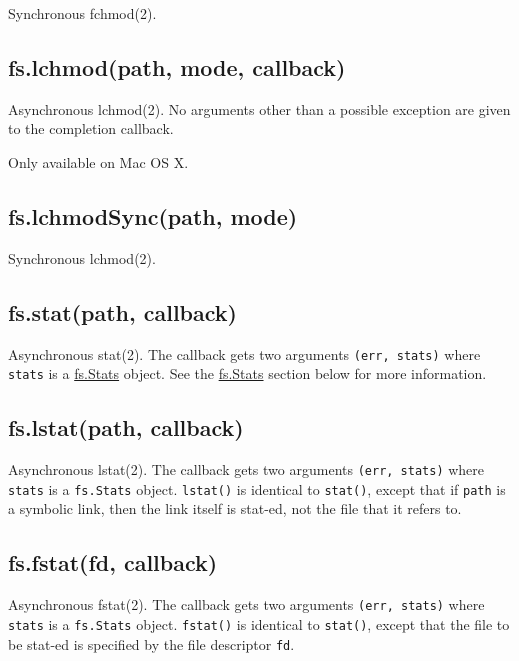 Synchronous fchmod(2).

\subsection{fs.lchmod(path, mode,
callback)}\label{fs.lchmodpath-mode-callback}

Asynchronous lchmod(2). No arguments other than a possible exception are
given to the completion callback.

Only available on Mac OS X.

\subsection{fs.lchmodSync(path, mode)}\label{fs.lchmodsyncpath-mode}

Synchronous lchmod(2).

\subsection{fs.stat(path, callback)}\label{fs.statpath-callback}

Asynchronous stat(2). The callback gets two arguments
\texttt{(err,\ stats)} where \texttt{stats} is a
\hyperref[fsux5fclassux5ffsux5fstats]{fs.Stats} object. See the
\hyperref[fsux5fclassux5ffsux5fstats]{fs.Stats} section below for more
information.

\subsection{fs.lstat(path, callback)}\label{fs.lstatpath-callback}

Asynchronous lstat(2). The callback gets two arguments
\texttt{(err,\ stats)} where \texttt{stats} is a \texttt{fs.Stats}
object. \texttt{lstat()} is identical to \texttt{stat()}, except that if
\texttt{path} is a symbolic link, then the link itself is stat-ed, not
the file that it refers to.

\subsection{fs.fstat(fd, callback)}\label{fs.fstatfd-callback}

Asynchronous fstat(2). The callback gets two arguments
\texttt{(err,\ stats)} where \texttt{stats} is a \texttt{fs.Stats}
object. \texttt{fstat()} is identical to \texttt{stat()}, except that
the file to be stat-ed is specified by the file descriptor \texttt{fd}.


